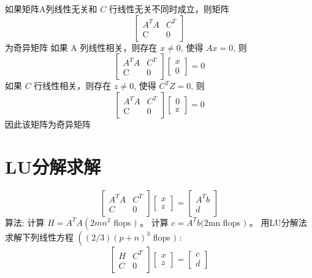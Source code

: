 如果矩阵A列线性无关和 $ C $ 行线性无关不同时成立，则矩阵
$$
\left[\begin{array}{cc}
A^{T} A & C^{T} \\
\mathrm{C} & 0
\end{array}\right]
$$
为奇异矩阵
如果 $ \mathrm{A} $ 列线性相关，则存在 $ x \neq 0 $, 使得 $ A x=0 $, 则
$$
\left[\begin{array}{cc}
A^{T} A & C^{T} \\
\mathrm{C} & 0
\end{array}\right]\left[\begin{array}{l}
x \\
0
\end{array}\right]=0
$$
如果 $ C $ 行线性相关，则存在 $ z \neq 0 $, 使得 $ C^{T} Z=0 $, 则
$$
\left[\begin{array}{cc}
A^{T} A & C^{T} \\
\mathrm{C} & 0
\end{array}\right]\left[\begin{array}{l}
0 \\
\mathrm{z}
\end{array}\right]=0
$$
因此该矩阵为奇异矩阵

\section{LU分解求解}

$$
\left[\begin{array}{cc}
A^{T} A & C^{T} \\
C & 0
\end{array}\right]\left[\begin{array}{l}
x \\
z
\end{array}\right]=\left[\begin{array}{c}
A^{T} b \\
d
\end{array}\right]
$$
算法:
计算 $ H=A^{T} A\left(2 m n^{2}\right. $ flops $ ) $ 。
计算 $ c=A^{T} b(2 \mathrm{mn} $ flops $ ) $ 。
用LU分解法求解下列线性方程 $ \left((2 / 3)(p+n)^{3}\right. $ flops $ ) $ :
$$
\left[\begin{array}{cc}
H & C^{T} \\
C & 0
\end{array}\right]\left[\begin{array}{l}
x \\
z
\end{array}\right]=\left[\begin{array}{l}
c \\
d
\end{array}\right]
$$

